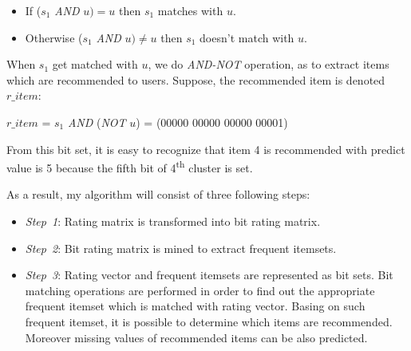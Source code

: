 \documentclass{article}
\begin{document}
\begin{itemize}
\item If ($s_1$ \textit{AND} $u) = u$ then $s_1$ matches with $u$.
\item Otherwise ($s_1$ \textit{AND} $u) \neq u$ then $s_1$ doesn't match with $u$.
\end{itemize}
When $s_1$ get matched with $u$, we do \textit{AND-NOT} operation, as to extract items which are recommended to users. Suppose, the recommended item is denoted $r\_item$:
\begin{center}
$r\_item$ = $s_1$ \textit{AND} (\textit{NOT} $u$) = (00000 00000 00000 00001)
\end{center}
From this bit set, it is easy to recognize that item 4 is recommended with predict value is 5 because the fifth bit of 4\textsuperscript{th} cluster is set.

As a result, my algorithm will consist of three following steps:
\begin{itemize}
\item \textit{Step~1}: Rating matrix is transformed into bit rating matrix.
\item \textit{Step~2}: Bit rating matrix is mined to extract frequent itemsets.
\item \textit{Step~3}: Rating vector and frequent itemsets are represented as bit sets. Bit matching operations are performed in order to find out the appropriate frequent itemset which is matched with rating vector. Basing on such frequent itemset, it is possible to determine which items are recommended. Moreover missing values of recommended items can be also predicted.
\end{itemize}
\end{document}

